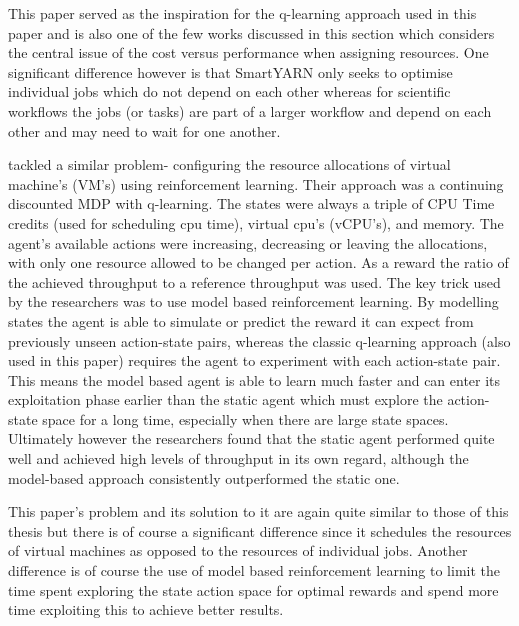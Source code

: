 This paper served as the inspiration for the q-learning approach used in this paper and is also one of the few works discussed in this section which considers the central issue of the cost versus performance when assigning resources. One significant difference however is that SmartYARN only seeks to optimise individual jobs which do not depend on each other whereas for scientific workflows the jobs (or tasks) are part of a larger workflow and depend on each other and may need to wait for one another.

\cite{vconf} tackled a similar problem- configuring the resource allocations of virtual machine's (VM's) using reinforcement learning. Their approach was a continuing discounted MDP with q-learning. The states were always a triple of CPU Time credits (used for scheduling cpu time), virtual cpu's (vCPU's), and memory. The agent's available actions were increasing, decreasing or leaving the allocations, with only one resource allowed to be changed per action. As a reward the ratio of the achieved throughput to a reference throughput was used. The key trick used by the researchers was to use model based reinforcement learning. By modelling states the agent is able to simulate or predict the reward it can expect from previously unseen action-state pairs, whereas the classic q-learning approach (also used in this paper) requires the agent to experiment with each action-state pair. This means the model based agent is able to learn much faster and can enter its exploitation phase earlier than the static agent which must explore the action-state space for a long time, especially when there are large state spaces. Ultimately however the researchers found that the static agent performed quite well and achieved high levels of throughput in its own regard, although the model-based approach consistently outperformed the static one. 

This paper's problem and its solution to it are again quite similar to those of this thesis but there is of course a significant difference since it schedules the resources of virtual machines as opposed to the resources of individual jobs. Another difference is of course the use of model based reinforcement learning to limit the time spent exploring the state action space for optimal rewards and spend more time exploiting this to achieve better results. 

